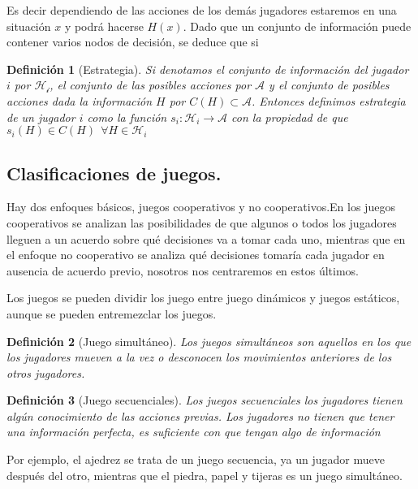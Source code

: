 \documentclass[a4paper]{report} %
\newtheorem{definicion}{Definición}[section]
\begin{document}
 Es decir dependiendo de las acciones de los demás jugadores estaremos en una situación $x$ y podrá hacerse $H(x)$. Dado que un conjunto de información puede contener varios nodos de decisión, se deduce que si

\begin{definicion}[Estrategia]
Si denotamos el conjunto de información del jugador $i$ por $\mathcal{H_i}$, el conjunto de las posibles acciones por $\mathcal{A} $ y el conjunto de posibles acciones dada la información $H$ por $ C(H) \subset \mathcal{A} $. Entonces definimos estrategia de un jugador $i$ como la función $s_i:\mathcal{H}_i\longrightarrow \mathcal{A}$ con la propiedad de que $s_i(H) \in C(H)~~ \forall H \in \mathcal{H}_i $
\end{definicion}

\subsection{Clasificaciones de juegos.}

Hay dos enfoques básicos, juegos cooperativos y no cooperativos.En los juegos cooperativos se analizan las posibilidades de que algunos o todos los jugadores lleguen a un acuerdo sobre qué decisiones va a tomar cada uno, mientras que en el enfoque no cooperativo se analiza qué decisiones tomaría cada jugador en ausencia de acuerdo previo, nosotros nos centraremos en estos últimos.

Los juegos se pueden dividir los juego entre juego dinámicos y juegos estáticos, aunque se pueden entremezclar los juegos.

\begin{definicion}[Juego simultáneo]
Los juegos simultáneos son aquellos en los que los jugadores 
mueven a la vez o desconocen los movimientos anteriores de los 
otros jugadores. 
\end{definicion}


\begin{definicion}[Juego secuenciales]
Los juegos secuenciales los jugadores tienen algún 
conocimiento de las acciones previas. Los jugadores no tienen que 
tener una información perfecta, es suficiente con que tengan algo 
de información
\end{definicion}

Por ejemplo, el ajedrez se trata de un juego secuencia, ya un jugador mueve después del otro, mientras que el piedra, papel y tijeras es un juego simultáneo.
\end{document}
